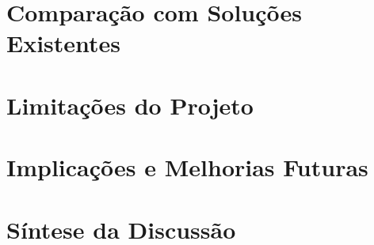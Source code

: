 
\section{Comparação com Soluções Existentes}
\label{sec:comparacao-solucoes}


\section{Limitações do Projeto}
\label{sec:limitacoes-projeto}


\section{Implicações e Melhorias Futuras}
\label{sec:melhorias-futuras}


\section{Síntese da Discussão}
\label{sec:sintese-discussao}

